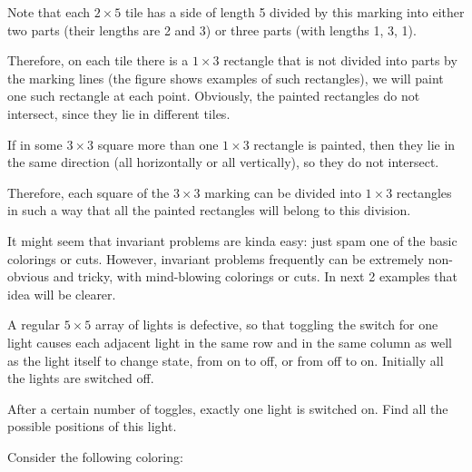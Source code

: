 Note that each $2\times 5$ tile has a side of length 5 divided by this marking into either two parts (their lengths are 2 and 3) or three parts (with lengths 1, 3, 1).

Therefore, on each tile there is a $1\times 3$ rectangle that is not divided into parts by the marking lines (the figure shows examples of such rectangles), we will paint one such rectangle at each point. Obviously, the painted rectangles do not intersect, since they lie in different tiles.

If in some $3\times 3$ square more than one $1\times 3$ rectangle is painted, then they lie in the same direction (all horizontally or all vertically), so they do not intersect.

Therefore, each square of the $3\times 3$ marking can be divided into $1\times 3$ rectangles in such a way that all the painted rectangles will belong to this division.

It might seem that invariant problems are kinda easy: just spam one of the basic colorings or cuts. However, invariant problems frequently can be extremely non-obvious and tricky, with mind-blowing colorings or cuts. In next 2 examples that idea will be clearer. 

\begin{example}[APMO 2007]
    A regular $5\times 5$ array of lights is defective, so that toggling the switch for one light causes each adjacent light in the same row and in the same column as well as the light itself to change state, from on to off, or from off to on. Initially all the lights are switched off.
    
    After a certain number of toggles, exactly one light is switched on. Find all the possible positions of this light.
\end{example}

Consider the following coloring:

\begin{center} 
\end{center}

